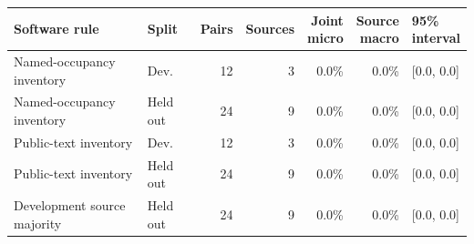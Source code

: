 \begin{tabular}{llrrrrl}\toprule
Software rule & Split & Pairs & Sources & \shortstack{Joint\\micro} & \shortstack{Source\\macro} & \shortstack{95\%\\interval}\\\midrule
Named-occupancy inventory & Dev. & 12 & 3 & 0.0\% & 0.0\% & [0.0, 0.0]\\
Named-occupancy inventory & Held out & 24 & 9 & 0.0\% & 0.0\% & [0.0, 0.0]\\
Public-text inventory & Dev. & 12 & 3 & 0.0\% & 0.0\% & [0.0, 0.0]\\
Public-text inventory & Held out & 24 & 9 & 0.0\% & 0.0\% & [0.0, 0.0]\\
Development source majority & Held out & 24 & 9 & 0.0\% & 0.0\% & [0.0, 0.0]\\
\bottomrule\end{tabular}
